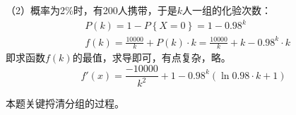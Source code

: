 （2）概率为2\%时，有200人携带，于是$k$人一组的化验次数：
\begin{align*}
&P\left( k \right) =1-P\left\{ X=0 \right\} =1-0.98^k \\
&f\left( k \right) =\frac{10000}{k}+P\left( k \right) \cdot k=\frac{10000}{k}+k-0.98^k\cdot k
\end{align*}
即求函数$f\left( k \right) $的最值，求导即可，有点复杂，略。
\[
f'\left( x \right) =\frac{-10000}{k^2}+1-0.98^k\left( \ln 0.98\cdot k+1 \right)
\]

\begin{tcolorbox}
本题关键捋清分组的过程。
\end{tcolorbox}





